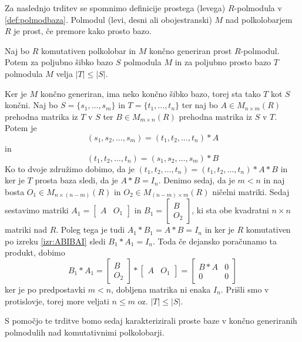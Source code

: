 \documentclass[mat1]{fmfdelo}
\newcommand{\abs}[1]{\ensuremath{\lvert #1 \rvert}}
\begin{document}
Za naslednjo trditev se spomnimo definicije prostega (levega) $R$-polmodula v \ref{def:polmodbaza}. Polmodul (levi, desni ali obojestranski) $M$ nad polkolobarjem $R$ je prost, če premore kako prosto bazo.

\begin{trditev}\label{trd:kardprostvsneprostbaz}
	Naj bo $R$ komutativen polkolobar in $M$ končno generiran prost $R$-polmodul. Potem za poljubno šibko bazo $S$ polmodula $M$ in za poljubno prosto bazo $T$ polmodula $M$ velja $\abs{T}\leq\abs{S}$.
\end{trditev}

\begin{dokaz}
	Ker je $M$ končno generiran, ima neko končno šibko bazo, torej sta tako $T$ kot $S$ končni. Naj bo $S = \{s_1,\ldots, s_m\}$ in $T =\{t_1, \ldots, t_n\}$ ter naj bo $A \in M_{n\times m}(R)$ prehodna matrika iz $T$ v $S$ ter $B\in M_{m\times n}(R)$ prehodna matrika iz $S$ v $T$. Potem je $$(s_1, s_2, \ldots, s_m) = (t_1, t_2, \ldots, t_n)*A$$ in $$(t_1, t_2, \ldots, t_n) = (s_1, s_2, \ldots, s_m)*B$$ Ko to dvoje združimo dobimo, da je $(t_1, t_2, \ldots, t_n) = (t_1, t_2, \ldots, t_n)*A*B$ in ker je $T$ prosta baza sledi, da je $A*B = I_n$. Denimo sedaj, da je $m < n$ in naj bosta $O_1\in M_{n\times (n-m)}(R)$ in $O_2\in M_{(n-m)\times m}(R)$ ničelni matriki. Sedaj sestavimo matriki $A_1 = \begin{bmatrix}
A & O_1
\end{bmatrix}$ in $B_1 = \begin{bmatrix}
B \\
 O_2
\end{bmatrix}$, ki sta obe kvadratni $n\times n$ matriki nad $R$. Poleg tega je tudi $A_1*B_1 = A*B = I_n$ in ker je $R$ komutativen po izreku \ref{izr:ABIBAI} sledi $B_1*A_1 = I_n$. Toda če dejansko poračunamo ta produkt, dobimo $$B_1*A_1 = \begin{bmatrix}
B \\
O_2
\end{bmatrix} * \begin{bmatrix}
A & O_1
\end{bmatrix} = \begin{bmatrix}
B*A & 0 \\
0 & 0
\end{bmatrix}$$ ker je po predpostavki $m < n$, dobljena matrika ni enaka $I_n$. Prišli smo v protislovje, torej more veljati $n \leq m$ oz. $\abs{T} \leq \abs{S}$.
\end{dokaz}

S pomočjo te trditve bomo sedaj karakterizirali proste baze v končno generiranih polmodulih nad komutativnimi polkolobarji.
\end{document}

